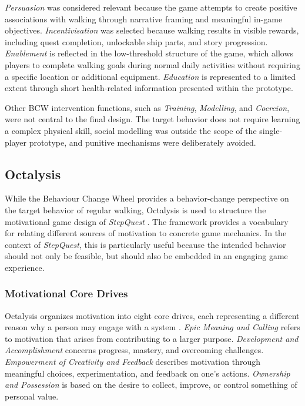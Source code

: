 \textit{Persuasion} was considered relevant because the game attempts to create positive associations with walking through narrative framing and meaningful in-game objectives. \textit{Incentivisation} was selected because walking results in visible rewards, including quest completion, unlockable ship parts, and story progression. \textit{Enablement} is reflected in the low-threshold structure of the game, which allows players to complete walking goals during normal daily activities without requiring a specific location or additional equipment. \textit{Education} is represented to a limited extent through short health-related information presented within the prototype.

Other BCW intervention functions, such as \textit{Training}, \textit{Modelling}, and \textit{Coercion}, were not central to the final design. The target behavior does not require learning a complex physical skill, social modelling was outside the scope of the single-player prototype, and punitive mechanisms were deliberately avoided.

\subsection{Octalysis}

While the Behaviour Change Wheel provides a behavior-change perspective on the target behavior of regular walking, Octalysis is used to structure the motivational game design of \textit{StepQuest} \cite{octalysis,key}. The framework provides a vocabulary for relating different sources of motivation to concrete game mechanics. In the context of \textit{StepQuest}, this is particularly useful because the intended behavior should not only be feasible, but should also be embedded in an engaging game experience.

\subsubsection{Motivational Core Drives}

Octalysis organizes motivation into eight core drives, each representing a different reason why a person may engage with a system \cite{octalysis,key}. \textit{Epic Meaning and Calling} refers to motivation that arises from contributing to a larger purpose. \textit{Development and Accomplishment} concerns progress, mastery, and overcoming challenges. \textit{Empowerment of Creativity and Feedback} describes motivation through meaningful choices, experimentation, and feedback on one's actions. \textit{Ownership and Possession} is based on the desire to collect, improve, or control something of personal value.

